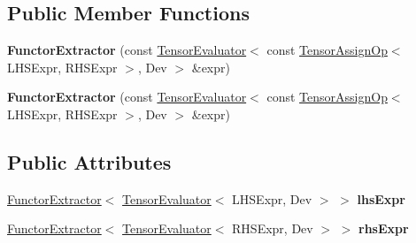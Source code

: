 \subsection*{Public Member Functions}
\begin{DoxyCompactItemize}
\item 
\mbox{\label{struct_eigen_1_1_tensor_sycl_1_1internal_1_1_functor_extractor_3_01_tensor_evaluator_3_01const_0bfc9e0269848e71715a5b777eed1a2f8_ac19ffcdf446d1f0a066681ebb43643fa}} 
{\bfseries Functor\+Extractor} (const \hyperlink{struct_eigen_1_1_tensor_evaluator}{Tensor\+Evaluator}$<$ const \hyperlink{class_eigen_1_1_tensor_assign_op}{Tensor\+Assign\+Op}$<$ L\+H\+S\+Expr, R\+H\+S\+Expr $>$, Dev $>$ \&expr)
\item 
\mbox{\label{struct_eigen_1_1_tensor_sycl_1_1internal_1_1_functor_extractor_3_01_tensor_evaluator_3_01const_0bfc9e0269848e71715a5b777eed1a2f8_ac19ffcdf446d1f0a066681ebb43643fa}} 
{\bfseries Functor\+Extractor} (const \hyperlink{struct_eigen_1_1_tensor_evaluator}{Tensor\+Evaluator}$<$ const \hyperlink{class_eigen_1_1_tensor_assign_op}{Tensor\+Assign\+Op}$<$ L\+H\+S\+Expr, R\+H\+S\+Expr $>$, Dev $>$ \&expr)
\end{DoxyCompactItemize}
\subsection*{Public Attributes}
\begin{DoxyCompactItemize}
\item 
\mbox{\label{struct_eigen_1_1_tensor_sycl_1_1internal_1_1_functor_extractor_3_01_tensor_evaluator_3_01const_0bfc9e0269848e71715a5b777eed1a2f8_ac0025ccd90ff5641dcf14e1a6a35ddaf}} 
\hyperlink{struct_eigen_1_1_tensor_sycl_1_1internal_1_1_functor_extractor}{Functor\+Extractor}$<$ \hyperlink{struct_eigen_1_1_tensor_evaluator}{Tensor\+Evaluator}$<$ L\+H\+S\+Expr, Dev $>$ $>$ {\bfseries lhs\+Expr}
\item 
\mbox{\label{struct_eigen_1_1_tensor_sycl_1_1internal_1_1_functor_extractor_3_01_tensor_evaluator_3_01const_0bfc9e0269848e71715a5b777eed1a2f8_abaa0d037b7c0fdf432b4e0934a23b3ae}} 
\hyperlink{struct_eigen_1_1_tensor_sycl_1_1internal_1_1_functor_extractor}{Functor\+Extractor}$<$ \hyperlink{struct_eigen_1_1_tensor_evaluator}{Tensor\+Evaluator}$<$ R\+H\+S\+Expr, Dev $>$ $>$ {\bfseries rhs\+Expr}
\end{DoxyCompactItemize}


